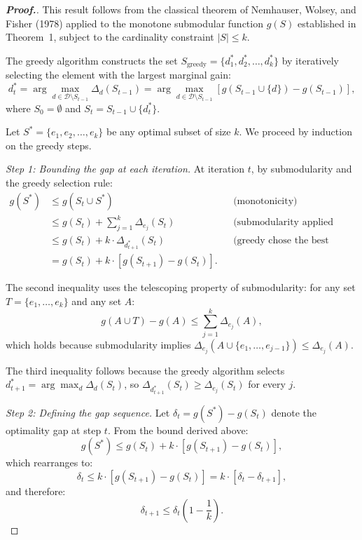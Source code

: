\documentclass[12pt,a4paper,oneside]{report}
\theoremstyle{definition}
\theoremstyle{remark}
\begin{document}
\begin{proof}[\textbf{Proof.}]
This result follows from the classical theorem of Nemhauser, Wolsey, and Fisher (1978) applied to the monotone submodular function $g(S)$ established in Theorem~1, subject to the cardinality constraint $|S| \leq k$.

The greedy algorithm constructs the set $S_{\text{greedy}} = \{d_1^*, d_2^*, \ldots, d_k^*\}$ by iteratively selecting the element with the largest marginal gain:
\[
d_t^* = \arg\max_{d \in \mathcal{D} \setminus S_{t-1}} \Delta_d(S_{t-1}) = \arg\max_{d \in \mathcal{D} \setminus S_{t-1}} \left[g(S_{t-1} \cup \{d\}) - g(S_{t-1})\right],
\]
where $S_0 = \emptyset$ and $S_t = S_{t-1} \cup \{d_t^*\}$.

Let $S^* = \{e_1, e_2, \ldots, e_k\}$ be any optimal subset of size $k$. We proceed by induction on the greedy steps.

\medskip
\noindent\textit{Step 1: Bounding the gap at each iteration.}
At iteration $t$, by submodularity and the greedy selection rule:
\begin{align*}
g(S^*) &\leq g(S_t \cup S^*) && \text{(monotonicity)} \\
&\leq g(S_t) + \sum_{j=1}^{k} \Delta_{e_j}(S_t) && \text{(submodularity applied iteratively)} \\
&\leq g(S_t) + k \cdot \Delta_{d_{t+1}^*}(S_t) && \text{(greedy chose the best single element)} \\
&= g(S_t) + k \cdot [g(S_{t+1}) - g(S_t)].
\end{align*}

The second inequality uses the telescoping property of submodularity: for any set $T = \{e_1, \ldots, e_k\}$ and any set $A$:
\[
g(A \cup T) - g(A) \leq \sum_{j=1}^{k} \Delta_{e_j}(A),
\]
which holds because submodularity implies $\Delta_{e_j}(A \cup \{e_1, \ldots, e_{j-1}\}) \leq \Delta_{e_j}(A)$.

The third inequality follows because the greedy algorithm selects $d_{t+1}^* = \arg\max_d \Delta_d(S_t)$, so $\Delta_{d_{t+1}^*}(S_t) \geq \Delta_{e_j}(S_t)$ for every $j$.

\medskip
\noindent\textit{Step 2: Defining the gap sequence.}
Let $\delta_t = g(S^*) - g(S_t)$ denote the optimality gap at step $t$. From the bound derived above:
\[
g(S^*) \leq g(S_t) + k \cdot [g(S_{t+1}) - g(S_t)],
\]
which rearranges to:
\[
\delta_t \leq k \cdot [g(S_{t+1}) - g(S_t)] = k \cdot [\delta_t - \delta_{t+1}],
\]
and therefore:
\[
\delta_{t+1} \leq \delta_t \left(1 - \frac{1}{k}\right).
\]


\end{proof}
\end{document}
